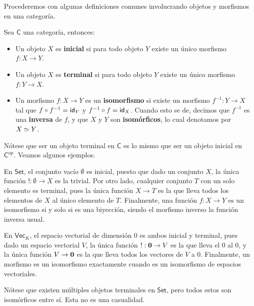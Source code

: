 \documentclass[../main.tex]{subfiles}
\begin{document}
Procederemos con algunas definiciones comunes involucrando objetos y morfismos en una categor\'ia.

\begin{definitionap}
    Sea $\mathsf{C}$ una categor\'ia, entonces:
    \begin{itemize}
        \item Un objeto $X$ es \textbf{inicial} si para todo objeto $Y$ existe un \'unico morfismo $f:X \to Y$.
        \item Un objeto $X$ es \textbf{terminal} si para todo objeto $Y$ existe un \'unico morfismo $f:Y \to X$.
        \item Un morfismo $f:X \to Y$ es un \textbf{isomorfismo} si existe un morfismo $f^{-1}:Y \to X$ tal que $f\circ f^{-1}=\idfunc[Y]$ y $f^{-1}\circ f = \idfunc[X]$. Cuando esto se de, decimos que $f^{-1}$ es una \textbf{inversa} de $f$, y que $X$ y $Y$ son \textbf{isom\'orficos}, lo cual denotamos por $\eqv{X}{Y}$.
    \end{itemize}
\end{definitionap}

N\'otese que ser un objeto terminal en $\mathsf{C}$ es lo mismo que ser un objeto inicial en $\mathsf{C}^{\text{op}}$. Veamos algunos ejemplos.

\begin{exampleap}
    En $\mathsf{Set}$, el conjunto vac\'io $\emptyset$ es inicial, puesto que dado un conjunto $X$, la \'unica funci\'on $!: \emptyset \to X$ es la trivial.
    Por otro lado, cualquier conjunto $T$ con un solo elemento es terminal, pues la \'unica funci\'on $X \to T$ es la que lleva todos los elementos de $X$ al \'unico elemento de $T$.
    Finalmente, una funci\'on $f:X \to Y$ es un isomorfismo si y solo si es una biyecci\'on, siendo el morfismo inverso la funci\'on inversa usual.
\end{exampleap}

\begin{exampleap}
    En $\mathsf{Vec}_K$, el espacio vectorial \emptyt de dimensi\'on 0 es ambos inicial y terminal, pues dado un espacio vectorial $V$, la \'unica funci\'on $! : \emptyt \to V$ es la que lleva el 0 al 0, y la \'unica funci\'on $V \to \emptyt$ es la que lleva todos los vectores de $V$ a $0$.
    Finalmente, un morfismo es un isomorfismo exactamente cuando es un isomorfismo de espacios vectoriales.
\end{exampleap}

N\'otese que existen m\'ultiples objetos terminales en $\mathsf{Set}$, pero todos estos son isom\'orficos entre s\'i. Esta no es una casualidad.
\end{document}
